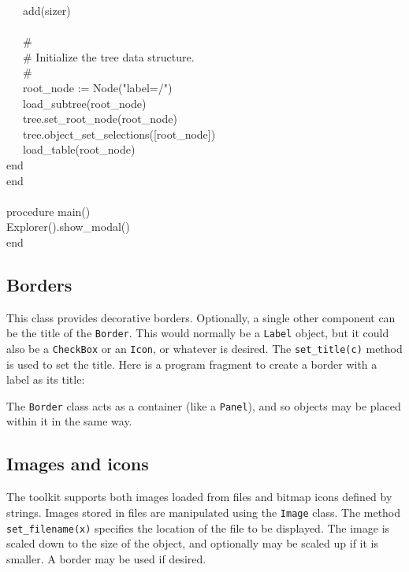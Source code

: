 {\>   \ \ \ add(sizer) \\
\ \\
\>   \ \ \ \# \\
\>   \ \ \ \# Initialize the tree data structure. \\
\>   \ \ \ \# \\
\>   \ \ \ root\_node := Node("label=/") \\
\>   \ \ \ load\_subtree(root\_node) \\
\>   \ \ \ tree.set\_root\_node(root\_node) \\
\>   \ \ \ tree.object\_set\_selections([root\_node]) \\
\>   \ \ \ load\_table(root\_node) \\
\>   end \\
end \\
\ \\
procedure main() \\
\>   Explorer().show\_modal() \\
end
}


\subsection{Borders}

This class provides decorative borders. Optionally, a single other
component can be the title of the \texttt{Border}. This would normally
be a \texttt{Label} object, but it could also be a \texttt{CheckBox} or
an \texttt{Icon}, or whatever is desired. The \texttt{set\_title(c)}
method is used to set the title. Here is a program fragment to create a
border with a label as its title:


The \texttt{Border} class acts as a container (like a \texttt{Panel}),
and so objects may be placed within it in the same way.

\subsection{Images and icons}

The toolkit supports both images loaded from files and
bitmap icons defined by strings. Images stored in files are manipulated
using the \texttt{Image} class. The method \texttt{set\_filename(x)}
specifies the location of the file to be displayed. The image is scaled down
to the size of the object, and optionally may be scaled up if it is
smaller. A border may be used if desired.

